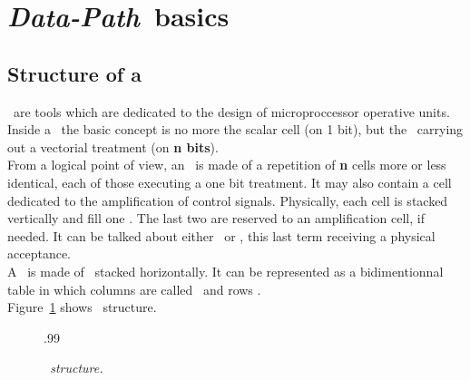    \section{{\it Data-Path}\ basics}
   \subsection{Structure of a \datapath}
   \forceindent
     \datapathcomp\ are tools which are dedicated to the design of
   microproccessor operative units. Inside a \datapath\ the basic
   concept is no more the scalar cell (on 1 bit), but the \operator\
   carrying out a vectorial treatment (on {\bf n bits}).\\
   \indent
     From a logical point of view, an \operator\ is made of a repetition
   of {\bf n} cells more or less identical, each of those executing a one
   bit treatment. It may also contain a cell dedicated to the amplification
   of control signals. Physically, each cell is stacked vertically and
   fill one \slice. The last two \slices are reserved to an amplification
   cell, if needed. It can be talked about either \operator\ or \column,
   this last term receiving a physical acceptance.\\
   \indent
     A \datapath\ is made of \operators\ stacked horizontally. It can be
   represented as a bidimentionnal table in which columns are called
   \operators\ and rows \slices.\\
   \indent
     Figure~\ref{schemadatapath} shows \datapaths\ structure.
   \begin{figure}[hbtp]
     \begin{center}
       \leavevmode\epsfxsize.99\textwidth{}
     \end{center}
     \caption{
       \label{schemadatapath}
       {\it \datapaths\ structure.}}
   \end{figure}
